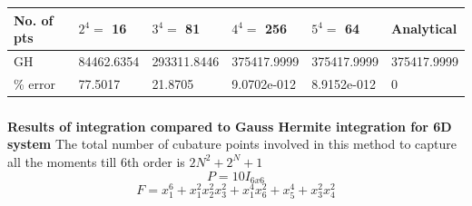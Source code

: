 \documentclass[11pt]{beamer}
\begin{document}
\begin{frame}
\tiny
\begin{center}
\tiny
  \begin{tabular}{ | l | l | l | l | l | l | }
    \hline
 No. of pts   & $2^4=$ 16    & $3^4=$ 81 			& $4^4=$ 256		 & $5^4=$ 64 	  	      &   Analytical \\   \hline 
   GH        &   84462.6354  & 293311.8446    & 375417.9999    & 375417.9999          &   375417.9999  \\ \hline
\% error        	  &   77.5017    		&  21.8705  	  	& 9.0702e-012   & 8.9152e-012 &   0     \\        \hline 
  \end{tabular}
\end{center} 
\end{frame}
\begin{frame}
\frametitle{ }
{\bf Results of integration compared to Gauss Hermite integration for 6D system}\newline
The total number of cubature points involved in this method to capture all the moments till 6th order is $2N^2+2^N+1$
\begin{equation}
P=10I_{6x6}
\end{equation}
\begin{equation*}
F=x_1^6+x_1^2x_2^2x_3^2+x_1^4x_6^2+x_5^4+x_3^2x_4^2
\end{equation*}
\end{frame}
\end{document}
